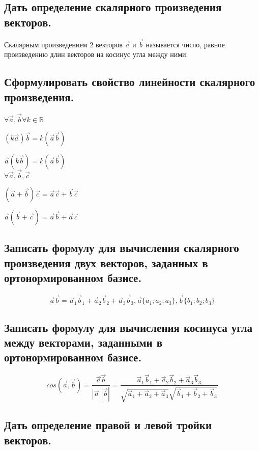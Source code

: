 \documentclass[a4paper, 10pt]{article}
\begin{document}
\subsection{Дать определение скалярного произведения векторов.}

Скалярным произведением 2 векторов $\vec{a}$ и $\vec{b}$ называется число, равное произведению длин
векторов на косинус угла между ними.

\subsection{Сформулировать свойство линейности скалярного произведения.}

\begin{center}
$\forall \vec{a}, \vec{b} \forall k \in \mathbb{R}$

$(k\vec{a})\vec{b} = k(\vec{a}\vec{b})$

$\vec{a}(k\vec{b}) = k(\vec{a}\vec{b})$\\

$\forall \vec{a}, \vec{b}, \vec{c}$

$(\vec{a} + \vec{b})\vec{c} = \vec{a}\vec{c} + \vec{b}\vec{c}$

$\vec{a}(\vec{b} + \vec{c}) = \vec{a}\vec{b} + \vec{a}\vec{c}$
\end{center}
\subsection{Записать формулу для вычисления скалярного произведения двух векторов, заданных в ортонормированном базисе.}

$$\vec{a}\vec{b} = \vec{a}_1\vec{b}_1 + \vec{a}_2\vec{b}_2 + \vec{a}_3\vec{b}_3,
\vec{a}\{a_1;a_2;a_3\},\vec{b}\{b_1;b_2;b_3\} $$

\subsection{Записать формулу для вычисления косинуса угла между векторами, заданными в ортонормированном базисе.}

$$cos(\vec{a},\vec{b}) = \frac{ \vec{a} \vec{b} }{ |\vec{a}| |\vec{b}| } = 
\frac{\vec{a}_1\vec{b}_1 + \vec{a}_2\vec{b}_2 + \vec{a}_3\vec{b}_3}
{\sqrt{\vec{a}_1 + \vec{a}_2 + \vec{a}_3}\sqrt{\vec{b}_1+\vec{b}_2+\vec{b}_3}}$$

\subsection{Дать определение правой и левой тройки векторов.}
\end{document}
